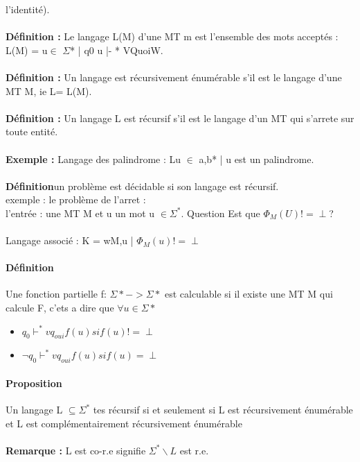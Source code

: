 \documentclass{article}
\begin{document}
l'identité).\\\\\textbf{Définition : }Le langage L(M) d'une MT m est l'ensemble des mots acceptés : L(M) = {u$\in$ $\Sigma$* | q0 u |- * VQuoiW}.\\\\\textbf{Définition : } Un langage est récursivement énumérable s'il est le langage d'une MT M, ie L= L(M).\\\\\textbf{Définition : } Un langage L est récursif s'il est le langage d'un MT qui s'arrete sur toute entité.\\\\\textbf{Exemple : } Langage des palindrome : L{u $\in$ {a,b}* | u est un palindrome}.\\\\ \textbf{Définition}un problème est décidable si son langage est récursif.\\exemple : le problème de l'arret :\\ l'entrée : une MT M et u un mot u $\in \Sigma^{*}$. Question Est que $\Phi_{M}(U) != \perp$?\\\\Langage associé : K = {wM,u | $\Phi_{M}(u) != \perp$}
\paragraph{Définition}
Une fonction partielle f: $\Sigma* -> \Sigma*$ est calculable si il existe une MT M qui calcule F, c'ets a dire que $\forall u \in \Sigma*$ \begin{itemize}
\item $q_{0} \vdash^{*} vq_{oui}f(u) si f(u) != \perp$
\item $\neg q_{0} \vdash^{*} vq_{oui}f(u) si f(u) = \perp$
\end{itemize}
\paragraph{Proposition}
Un langage L $\subseteq \Sigma^{*}$ tes récursif si et seulement si L est récursivement énumérable et L est complémentairement récursivement énumérable \\\\\textbf{Remarque : }L est co-r.e signifie $\Sigma^{*}\backslash L$ est r.e.
\end{document}
